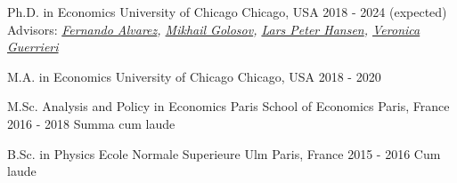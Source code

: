

\begin{cventries}

    \cventry
    {Ph.D. in Economics} %
    {University of Chicago} %
    {Chicago, USA} %
    {2018 - 2024 (expected)} %
    {Advisors: \textit{\href{https://alvarezfernando.com/}{Fernando Alvarez}, \href{https://voices.uchicago.edu/golosov/contact/}{Mikhail Golosov}, \href{https://larspeterhansen.org/contact/}{Lars Peter Hansen}, \href{https://voices.uchicago.edu/veronicaguerrieri/contact/}{Veronica Guerrieri}}}

    \cventry
    {M.A. in Economics} %
    {University of Chicago} %
    {Chicago, USA} %
    {2018 - 2020} %
    {}

    \cventry
    {M.Sc. Analysis and Policy in Economics} %
    {Paris School of Economics} %
    {Paris, France} %
    {2016 - 2018} %
    {Summa cum laude}

    \cventry
    {B.Sc. in Physics} %
    {Ecole Normale Superieure Ulm} %
    {Paris, France} %
    {2015 - 2016} %
    {Cum laude}

\end{cventries}
